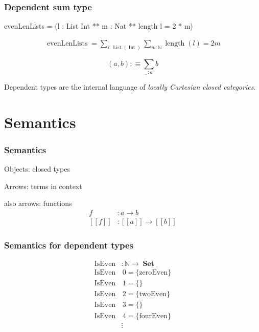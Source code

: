 \documentclass[
xcolor={usenames,dvipsnames,svgnames},
]{beamer}
\DeclareMathOperator{\Set}{\mathbf{Set}}
\DeclareMathOperator{\List}{List}
\DeclareMathOperator{\Int}{Int}
\DeclareMathOperator{\IsEven}{IsEven}
\newcommand{\N}{\ensuremath{\mathbb{N}}}
\begin{document}
  \begin{frame}[fragile]
    \frametitle{Dependent sum type}

    \begin{center}

    \begin{code}
evenLenLists = (l : List Int ** m : Nat ** length l = 2 * m)
    \end{code}

      \begin{align*}
        \operatorname{evenLenLists} = \sum_{l : \List(\Int)} \sum_{m:\N} \operatorname{length}(l) = 2m
      \end{align*}

      \[
        (a, b) :\equiv \sum_{\_ \,: a} b
      \]

    \end{center}
  \end{frame}

  \begin{frame}
    Dependent types are the internal language of \textit{locally Cartesian closed categories}.
  \end{frame}

  \section{Semantics}

  \begin{frame}
    \frametitle{Semantics}
    Objects: closed types

    Arrows: terms in context

    also arrows: functions
    \begin{align*}
      f &: a \to b \\
      [\![f]\!]  &: [\![a]\!] \to [\![b]\!]
    \end{align*}
  \end{frame}

  \begin{frame}
    \frametitle{Semantics for dependent types}
    \begin{align*}
      \IsEven&: \N \to \Set  \\
      \IsEven &\, 0 = \{ \textrm{zeroEven} \} \\
      \IsEven &\, 1 = \{ \textrm{} \} \\
      \IsEven &\, 2 = \{ \textrm{twoEven} \} \\
      \IsEven &\, 3 = \{ \textrm{} \} \\
      \IsEven &\, 4 = \{ \textrm{fourEven} \} \\
      &\vdots
    \end{align*}
  \end{frame}
\end{document}
